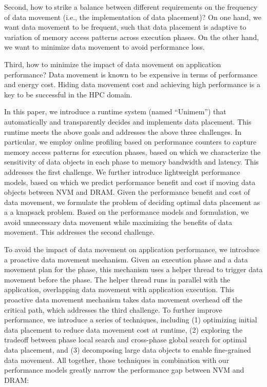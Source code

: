 Second, how to strike a balance between different requirements
on the frequency of data movement (i.e., the implementation of data placement)?
On one hand, we want data movement to be frequent, %
such that data placement is adaptive to variation of memory access patterns across execution phases.
On the other hand, we want to minimize data movement to avoid performance loss.

Third, how to minimize the impact of data movement on application performance? Data movement is known to be expensive
in terms of performance and energy cost. 
Hiding data movement cost and achieving high performance is
a key to be successful in the HPC domain.

In this paper, we introduce a runtime system (named ``Unimem'') that automatically and transparently decides and implements data placement.
This runtime meets the above goals and addresses the above three challenges.
In particular, we employ online profiling based on performance counters
to capture memory access patterns for execution phases, based on which we characterize the sensitivity of data objects in each phase to memory bandwidth and latency.
This addresses the first challenge.
We further introduce lightweight performance models, based on which we predict 
performance benefit and cost if moving data objects between NVM and DRAM.
Given the performance benefit and cost of data movement, we formulate the problem of deciding optimal data placement as a a knapsack problem.
Based on the performance models and formulation, we avoid unnecessary data movement
while maximizing the benefits of data movement.
This addresses the second challenge.

To avoid the impact of data movement on application performance, we introduce a proactive data movement mechanism. Given an execution phase and a data movement plan for the phase,
this mechanism uses a helper thread to trigger data movement before the phase.
The helper thread runs in parallel with the application, overlapping data movement with application execution. This proactive data movement mechanism takes data movement overhead off the critical path, which addresses the third challenge.
To further improve performance, we introduce a series of
techniques, including (1) optimizing initial data placement to reduce data movement cost at runtime, (2) %
exploring the tradeoff between phase local search and cross-phase global search for optimal data placement, and (3) decomposing large data objects to enable fine-grained data movement.
All together, those techniques in combination with our performance models
greatly narrow the performance gap between NVM and DRAM:



